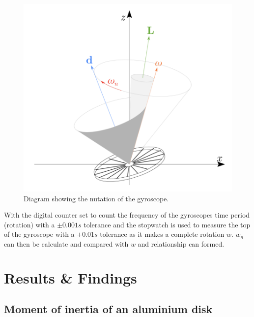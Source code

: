 \documentclass[12pt]{article}
\begin{document}
\begin{figure}[H]
\centering
\includegraphics[scale=0.6]{Images/Labscript/Gyroscope_Nutation.png}
\caption{Diagram showing the nutation of the gyroscope. \cite{Exp.4-2019}}
\label{Nutation of the gyroscope Setup}
\end{figure}

With the digital counter set to count the frequency of the gyroscopes time period (rotation) with a $\pm0.001s$ tolerance and the stopwatch is used to measure the top of the gyroscope with a $\pm0.01s$ tolerance as it makes a complete rotation $w$. $w_n$ can then be calculate and compared with $w$ and relationship can formed.

\section{Results \& Findings}
\label{Results & findings Section}
\subsection{Moment of inertia of an aluminium disk}
\label{Moment of inertia of an aluminium disk Findings}
\end{document}
